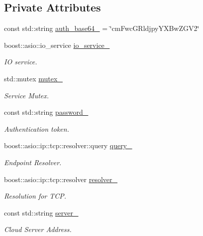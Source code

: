 \subsection*{Private Attributes}
\begin{DoxyCompactItemize}
\item 
const std\-::string \hyperlink{classrapp_1_1services_1_1service__controller_abce9746f68bc23fa140453e7af539bee}{auth\-\_\-base64\-\_\-} = \char`\"{}cm\-Fwc\-G\-Rldjpy\-Y\-X\-Bw\-Z\-G\-V2\char`\"{}
\item 
boost\-::asio\-::io\-\_\-service \hyperlink{classrapp_1_1services_1_1service__controller_a83182ff1f01ebf6df3c9504638141f3b}{io\-\_\-service\-\_\-}
\begin{DoxyCompactList}\small\item\em I\-O service. \end{DoxyCompactList}\item 
std\-::mutex \hyperlink{classrapp_1_1services_1_1service__controller_aebff63a67dbf4e9ca76398ea96bd769a}{mutex\-\_\-}
\begin{DoxyCompactList}\small\item\em Service Mutex. \end{DoxyCompactList}\item 
const std\-::string \hyperlink{classrapp_1_1services_1_1service__controller_a7e10e406506cc0540c89eef268b64eca}{password\-\_\-}
\begin{DoxyCompactList}\small\item\em Authentication token. \end{DoxyCompactList}\item 
boost\-::asio\-::ip\-::tcp\-::resolver\-::query \hyperlink{classrapp_1_1services_1_1service__controller_adee18fff2cac5e4e95cf36ee20b568c0}{query\-\_\-}
\begin{DoxyCompactList}\small\item\em Endpoint Resolver. \end{DoxyCompactList}\item 
boost\-::asio\-::ip\-::tcp\-::resolver \hyperlink{classrapp_1_1services_1_1service__controller_a79b1ff3db2397d6a47a20e4b50c3dcef}{resolver\-\_\-}
\begin{DoxyCompactList}\small\item\em Resolution for T\-C\-P. \end{DoxyCompactList}\item 
const std\-::string \hyperlink{classrapp_1_1services_1_1service__controller_af66fa6736ac155e664704dc46c2ebc4f}{server\-\_\-}
\begin{DoxyCompactList}\small\item\em Cloud Server Address. \end{DoxyCompactList}\item 

\end{DoxyCompactItemize}
